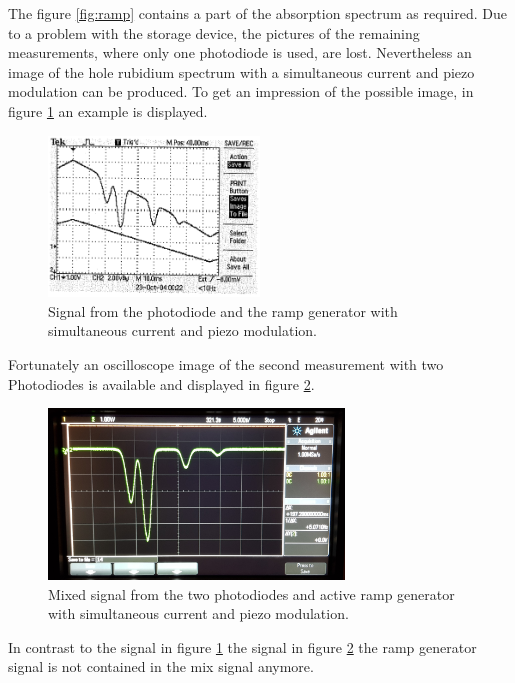 The figure \ref{fig:ramp} contains a part of the
absorption spectrum as required.
Due to a problem with the storage device, the pictures of the remaining
measurements, where only one photodiode is used, are lost.
Nevertheless an image of the hole rubidium spectrum
with a simultaneous current and piezo modulation
can be produced. To get an impression of the possible image,
in figure \ref{fig:theory_curve} an example is displayed.

\FloatBarrier
\begin{figure}
  \centering
  \includegraphics[width = 0.5\textwidth]{Rb_modulation.png}
  \caption{Signal from the photodiode and the ramp generator with
  simultaneous current and piezo modulation. \cite{V60}}
  \label{fig:theory_curve}
\end{figure}
\FloatBarrier

Fortunately an oscilloscope image of the second measurement
with two Photodiodes
is available and displayed in figure \ref{fig:2dioden}.

\FloatBarrier
\begin{figure}
  \centering
  \includegraphics[width = 0.7\textwidth]{./figures/Rb_spectrum.jpg}
  \caption{Mixed signal from the two photodiodes and active ramp generator with
  simultaneous current and piezo modulation.}
  \label{fig:2dioden}
\end{figure}
\FloatBarrier

In contrast to the signal in figure \ref{fig:theory_curve}
the signal in figure \ref{fig:2dioden} the
ramp generator signal is not contained in the mix signal anymore.

